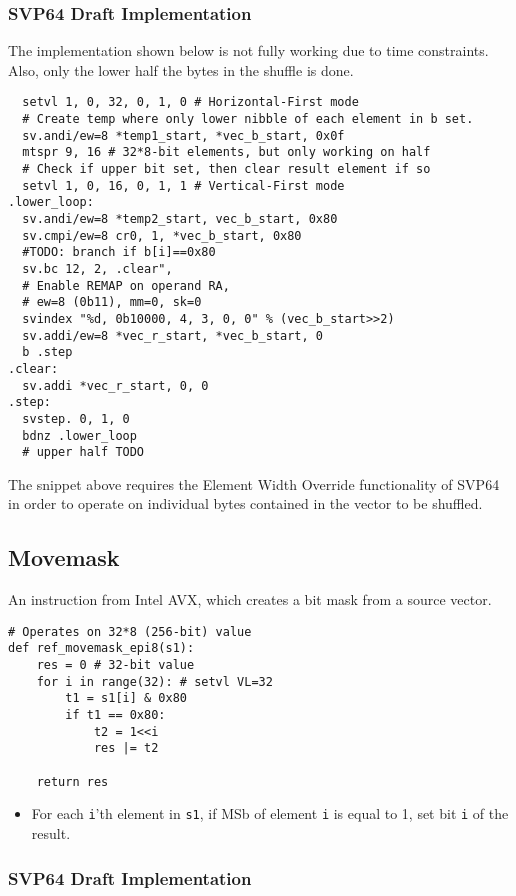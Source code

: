 \subsubsection{\acrshort{SVP64} Draft Implementation}

The implementation shown below is not fully working due to time constraints.
Also, only the lower half the bytes in the shuffle is done.

\begin{verbatim}
  setvl 1, 0, 32, 0, 1, 0 # Horizontal-First mode
  # Create temp where only lower nibble of each element in b set.
  sv.andi/ew=8 *temp1_start, *vec_b_start, 0x0f
  mtspr 9, 16 # 32*8-bit elements, but only working on half
  # Check if upper bit set, then clear result element if so
  setvl 1, 0, 16, 0, 1, 1 # Vertical-First mode
.lower_loop:
  sv.andi/ew=8 *temp2_start, vec_b_start, 0x80
  sv.cmpi/ew=8 cr0, 1, *vec_b_start, 0x80
  #TODO: branch if b[i]==0x80
  sv.bc 12, 2, .clear",
  # Enable REMAP on operand RA,
  # ew=8 (0b11), mm=0, sk=0
  svindex "%d, 0b10000, 4, 3, 0, 0" % (vec_b_start>>2)
  sv.addi/ew=8 *vec_r_start, *vec_b_start, 0
  b .step
.clear:
  sv.addi *vec_r_start, 0, 0
.step:
  svstep. 0, 1, 0
  bdnz .lower_loop
  # upper half TODO
\end{verbatim}

The snippet above requires the Element Width Override functionality of
\acrshort{SVP64} in order to operate on individual bytes contained
in the vector to be shuffled.

\subsection{Movemask}

An instruction from Intel \acrshort{AVX}, which creates a bit mask from a
source vector.

\begin{verbatim}
# Operates on 32*8 (256-bit) value
def ref_movemask_epi8(s1):
    res = 0 # 32-bit value
    for i in range(32): # setvl VL=32
        t1 = s1[i] & 0x80
        if t1 == 0x80:
            t2 = 1<<i
            res |= t2

    return res
\end{verbatim}

\begin{itemize}
  \item For each \texttt{i}'th element in \texttt{s1}, if \acrshort{MSb} of
        element \texttt{i} is equal to 1, set bit \texttt{i} of the result.
\end{itemize}

\subsubsection{SVP64 Draft Implementation}
